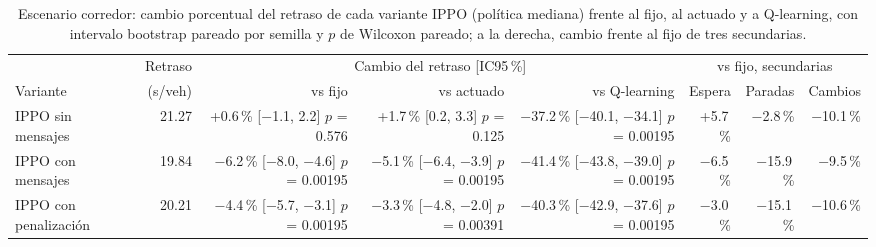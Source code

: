 \begin{table}[H]
\centering
\scriptsize
\setlength{\tabcolsep}{3pt}
\begin{tabular}{lrrrrrrr}
\toprule
 & Retraso & \multicolumn{3}{c}{Cambio del retraso [IC95\,\%]} & \multicolumn{3}{c}{vs fijo, secundarias} \\
\cmidrule(lr){3-5}\cmidrule(lr){6-8}
Variante & (s/veh) & vs fijo & vs actuado & vs Q-learning & Espera & Paradas & Cambios \\
\midrule
IPPO sin mensajes & 21.27 & \makecell[r]{+0.6\,\%\\{}[$-$1.1, 2.2]\\$p$ = 0.576} & \makecell[r]{+1.7\,\%\\{}[0.2, 3.3]\\$p$ = 0.125} & \makecell[r]{$-$37.2\,\%\\{}[$-$40.1, $-$34.1]\\$p$ = 0.00195} & +5.7\,\% & $-$2.8\,\% & $-$10.1\,\% \\
IPPO con mensajes & 19.84 & \makecell[r]{$-$6.2\,\%\\{}[$-$8.0, $-$4.6]\\$p$ = 0.00195} & \makecell[r]{$-$5.1\,\%\\{}[$-$6.4, $-$3.9]\\$p$ = 0.00195} & \makecell[r]{$-$41.4\,\%\\{}[$-$43.8, $-$39.0]\\$p$ = 0.00195} & $-$6.5\,\% & $-$15.9\,\% & $-$9.5\,\% \\
IPPO con penalización & 20.21 & \makecell[r]{$-$4.4\,\%\\{}[$-$5.7, $-$3.1]\\$p$ = 0.00195} & \makecell[r]{$-$3.3\,\%\\{}[$-$4.8, $-$2.0]\\$p$ = 0.00391} & \makecell[r]{$-$40.3\,\%\\{}[$-$42.9, $-$37.6]\\$p$ = 0.00195} & $-$3.0\,\% & $-$15.1\,\% & $-$10.6\,\% \\
\bottomrule
\end{tabular}
\caption[Escenario corredor: cambio del retraso de las variantes IPPO]{Escenario corredor: cambio porcentual del retraso de cada variante IPPO (política mediana) frente al fijo, al actuado y a Q-learning, con intervalo bootstrap pareado por semilla y $p$ de Wilcoxon pareado; a la derecha, cambio frente al fijo de tres secundarias.}
\label{tab:corredor-u4-deltas}
\end{table}
